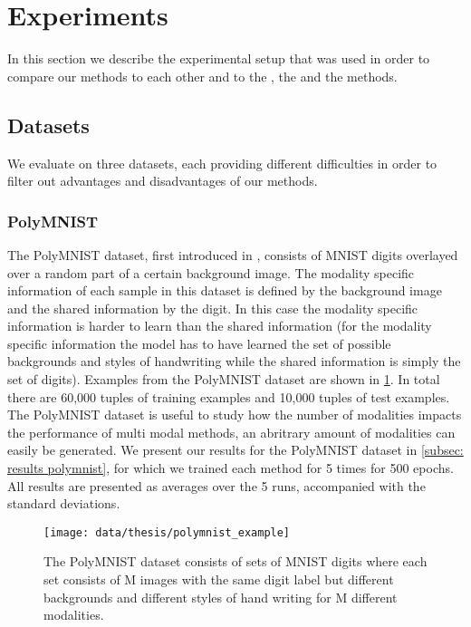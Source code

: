 \section{Experiments}
In this section we describe the experimental setup that was used in order to compare our methods to each other and to the , the  and the  methods.

\subsection{Datasets}
We evaluate on three datasets, each providing different difficulties in order to filter out advantages and disadvantages of our methods.

\subsubsection{PolyMNIST} \label{polymnist}
The PolyMNIST dataset, first introduced in \cite{sutter_multimodal_2020}, consists of MNIST digits overlayed over a random part of a certain background image.
The modality specific information of each sample in this dataset is defined by the background image and the shared information by the digit.
In this case the modality specific information is harder to learn than the shared information (for the modality specific information the model has to have learned the set of possible backgrounds and styles of handwriting while the shared information is simply the set of digits).
Examples from the PolyMNIST dataset are shown in \cref{fig:PolyMNIST}.
In total there are 60,000 tuples of training examples and 10,000 tuples of test examples.
The PolyMNIST dataset is useful to study how the number of modalities impacts the performance of multi modal methods, an abritrary amount of modalities can easily be generated.
We present our results for the PolyMNIST dataset in \cref{subsec: results polymnist}, for which we trained each method for 5 times for 500 epochs.
All results are presented as averages over the 5 runs, accompanied with the standard deviations.


\begin{figure}[h!]
    \centering
    \texttt{[image: data/thesis/polymnist\_example]}
    \caption{The PolyMNIST dataset consists of sets of MNIST
    digits where each set consists of M images
    with the same digit label but different backgrounds
    and different styles of hand writing for M different modalities.}
    \label{fig:PolyMNIST}
\end{figure}

